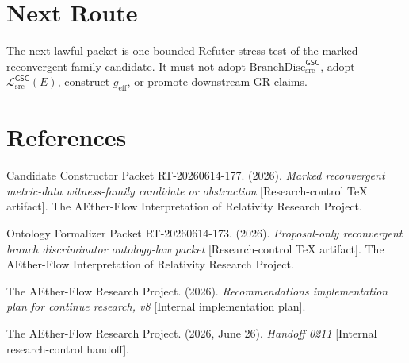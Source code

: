 \documentclass[11pt]{article}
\newcommand{\MetricData}{\mathcal{L}_{\mathrm{src}}^{\mathsf{GSC}}}
\newcommand{\geff}{g_{\mathrm{eff}}}
\newcommand{\BranchDisc}{\mathrm{BranchDisc}_{\mathrm{src}}^{\mathsf{GSC}}}
\begin{document}
\section{Next Route}

The next lawful packet is one bounded Refuter stress test of the marked
reconvergent family candidate. It must not adopt \(\BranchDisc\), adopt
\(\MetricData(E)\), construct \(\geff\), or promote downstream GR claims.

\section*{References}

Candidate Constructor Packet RT-20260614-177. (2026). \textit{Marked
reconvergent metric-data witness-family candidate or obstruction}
[Research-control TeX artifact]. The AEther-Flow Interpretation of Relativity
Research Project.

Ontology Formalizer Packet RT-20260614-173. (2026). \textit{Proposal-only
reconvergent branch discriminator ontology-law packet} [Research-control TeX
artifact]. The AEther-Flow Interpretation of Relativity Research Project.

The AEther-Flow Research Project. (2026). \textit{Recommendations
implementation plan for continue research, v8} [Internal implementation
plan].

The AEther-Flow Research Project. (2026, June 26). \textit{Handoff 0211}
[Internal research-control handoff].
\end{document}
